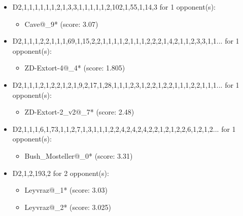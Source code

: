 \begin{appendices}
\begin{itemize}
    \item D2,1,1,1,1,1,1,2,1,3,3,1,1,1,1,1,2,102,1,55,1,14,3 for 1 opponent(s):
    \begin{multicols}{3}
         \begin{itemize}
            \item Cave@\_9* (score: 3.07)
        \end{itemize}
     \end{multicols}
     
    \item D2,1,1,1,2,2,1,1,1,69,1,15,2,2,1,1,1,1,2,1,1,1,2,2,2,1,4,2,1,1,2,3,3,1,1... for 1 opponent(s):
    \begin{multicols}{3}
         \begin{itemize}
            \item ZD-Extort-4@\_4* (score: 1.805)
        \end{itemize}
     \end{multicols}
     
    \item D2,1,1,1,2,1,2,2,1,2,1,9,2,17,1,28,1,1,1,2,3,1,2,2,1,2,2,1,1,1,2,2,1,1,1... for 1 opponent(s):
    \begin{multicols}{3}
         \begin{itemize}
            \item ZD-Extort-2\_v2@\_7* (score: 2.48)
        \end{itemize}
     \end{multicols}
     
    \item D2,1,1,1,6,1,73,1,1,2,7,1,3,1,1,1,2,2,4,2,4,2,4,2,2,1,2,1,2,2,6,1,2,1,2... for 1 opponent(s):
    \begin{multicols}{3}
         \begin{itemize}
            \item Bush\_Mosteller@\_0* (score: 3.31)
        \end{itemize}
     \end{multicols}
     
    \item D2,1,2,193,2 for 2 opponent(s):
    \begin{multicols}{3}
         \begin{itemize}
            \item Leyvraz@\_1* (score: 3.03)
            \item Leyvraz@\_2* (score: 3.025)
        \end{itemize}
     \end{multicols}
     

\end{itemize}
\end{appendices}
